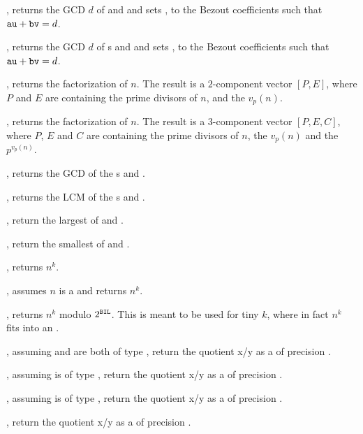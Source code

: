 , returns the GCD
$d$ of  and  and sets ,  to the Bezout coefficients
such that ${\tt au} + {\tt bv} = d$.

, returns the GCD $d$ of
s  and  and sets ,  to the Bezout
coefficients such that ${\tt au} + {\tt bv} = d$.

, returns the factorization of $n$. The result
is a $2$-component vector $[P,E]$, where $P$ and $E$ are 
containing the prime divisors of $n$, and the $v_p(n)$.

, returns the factorization of $n$. The result
is a $3$-component vector $[P,E,C]$, where $P$, $E$ and $C$ are
 containing the prime divisors of $n$, the $v_p(n)$
and the $p^{v_p(n)}$.

, returns the GCD of the s  and
.

, returns the LCM of the s  and
.

, return the largest of  and .

, return the smallest of  and .

, returns $n^k$.

, assumes $n$ is a  and returns $n^k$.

, returns $n^k$ modulo $2^{\tt BIL}$. This is
meant to be used for tiny $k$, where in fact $n^k$ fits into an .

, assuming  and 
are both of type , return the quotient x/y as a  of
precision .

, assuming 
is of type , return the quotient x/y as a  of
precision .

, assuming 
is of type , return the quotient x/y as a  of
precision .

, return the quotient x/y as a
 of precision .


